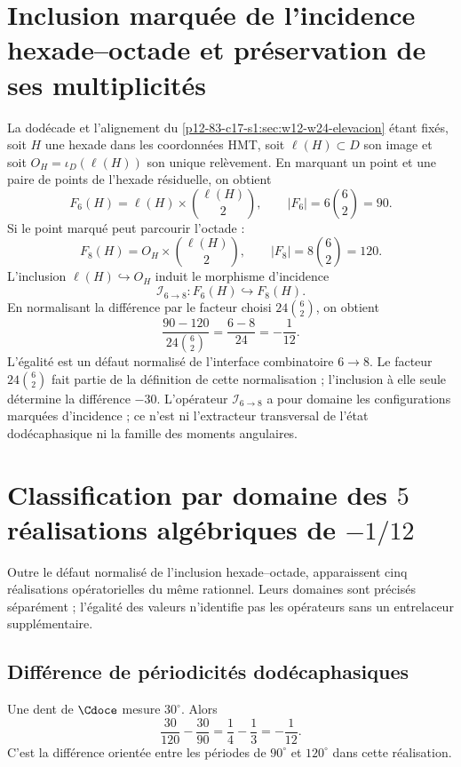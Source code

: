 \section{Inclusion marquée de l'incidence hexade--octade et préservation de ses multiplicités}

La dodécade et l’alignement du
\cref{p12-83-c17-s1:sec:w12-w24-elevacion} étant fixés, soit \(H\) une hexade dans les coordonnées HMT,
soit \(\ell(H)\subset D\) son image et soit
\(O_H=\iota_D(\ell(H))\) son unique relèvement. En marquant un point
et une paire de points de l’hexade résiduelle, on obtient
\[
F_6(H)=\ell(H)\times\binom{\ell(H)}2,
\qquad
|F_6|=6\binom62=90.
\]
Si le point marqué peut parcourir l’octade :
\[
F_8(H)=O_H\times\binom{\ell(H)}2,
\qquad
|F_8|=8\binom62=120.
\]
L’inclusion \(\ell(H)\hookrightarrow O_H\) induit le morphisme d’incidence
\[
 \mathcal I_{6\to8}:F_6(H)\hookrightarrow F_8(H).
\]
En normalisant la différence par le facteur
choisi \(24\binom62\), on obtient
\[
\boxed{
\frac{90-120}{24\binom62}
=\frac{6-8}{24}
=-\frac1{12}.}
\]
L’égalité est un défaut normalisé de l’interface combinatoire
\(6\to8\). Le facteur \(24\binom62\) fait partie de la définition de cette
normalisation ; l’inclusion à elle seule détermine la différence \(-30\).
L’opérateur \(\mathcal I_{6\to8}\) a pour domaine les configurations
marquées d’incidence ; ce n’est ni l’extracteur transversal de l’état
dodécaphasique ni la famille des moments angulaires.

\section{Classification par domaine des \(5\) réalisations algébriques de \(-1/12\)}

Outre le défaut normalisé de l’inclusion hexade--octade, apparaissent
cinq réalisations opératorielles du même rationnel. Leurs domaines sont
précisés séparément ; l’égalité des valeurs n’identifie pas les
opérateurs sans un entrelaceur supplémentaire.

\subsection{Différence de périodicités dodécaphasiques}

Une dent de \(\Cdoce\) mesure \(30^\circ\). Alors
\[
\frac{30}{120}-\frac{30}{90}
=\frac14-\frac13
=-\frac1{12}.
\]
C’est la différence orientée entre les périodes de \(90^\circ\) et
\(120^\circ\) dans cette réalisation.

